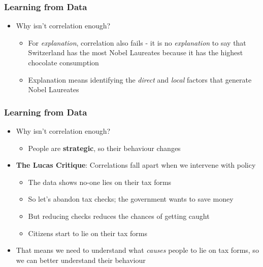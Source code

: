 \documentclass[xcolor=x11names,compress]{beamer}\usepackage[]{graphicx}\usepackage[]{color}
\renewcommand{\(}{\begin{columns}}
\renewcommand{\)}{\end{columns}}
\newcommand{\<}[1]{\begin{column}{#1}}
\renewcommand{\>}{\end{column}}
\begin{document}
\begin{frame}
\frametitle{Learning from Data}
\begin{itemize}
\item Why isn't correlation enough?
\begin{itemize}
\item For \textit{explanation}, correlation also fails - it is no \textit{explanation} to say that Switzerland has the most Nobel Laureates because it has the highest chocolate consumption
\item Explanation means identifying the \textit{direct} and \textit{local} factors that generate Nobel Laureates
\end{itemize}
\end{itemize}
\end{frame}

\begin{frame}
\frametitle{Learning from Data}
\begin{itemize}
\item Why isn't correlation enough?
\pause
\begin{itemize}
\item People are \textbf{strategic}, so their behaviour changes
\pause
\end{itemize}
\item \textbf{The Lucas Critique}: Correlations fall apart when we intervene with policy
\begin{itemize}
\item The data shows no-one lies on their tax forms
\pause
\item So let's abandon tax checks; the government wants to save money
\pause
\item But reducing checks reduces the chances of getting caught
\pause
\item Citizens start to lie on their tax forms
\pause
\end{itemize}
\item That means we need to understand what \textit{causes} people to lie on tax forms, so we can better understand their behaviour
\end{itemize}
\end{frame}
\end{document}
